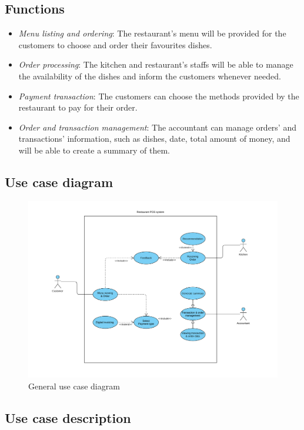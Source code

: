 \documentclass[a4paper,11pt]{extarticle}
\begin{document}
\subsection{Functions}
\begin{itemize}
    \item[] \emph{Menu listing and ordering}: The restaurant's menu will be provided for the customers to choose and order their favourites dishes.
    \item[] \emph{Order processing}: The kitchen and restaurant's staffs will be able to manage the availability of the dishes and inform the customers whenever needed.
    \item[] \emph{Payment transaction}: The customers can choose the methods provided by the restaurant to pay for their order. 
    \item[] \emph{Order and transaction management}: The accountant can manage orders' and transactions' information, such as dishes, date, total amount of money, and will be able to create a summary of them.
\end{itemize}

\subsection{Use case diagram}
\begin{figure}[htbp]
    \centering
    \includegraphics[width=1\textwidth]{general_usecase_diagram.pdf}
    \caption{General use case diagram}
    \label{fig:usecasediagram}
\end{figure}

\subsection{Use case description}
\end{document}
